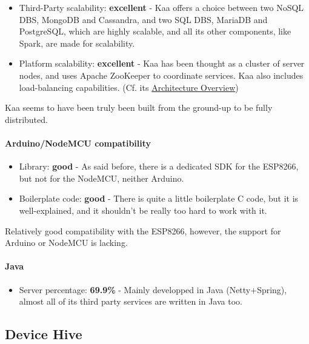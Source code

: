 \documentclass{article}
\begin{document}
\begin{itemize}
\item Third-Party scalability: \textbf{excellent} - Kaa offers a choice between two NoSQL DBS, MongoDB and Cassandra, and two SQL DBS, MariaDB and PostgreSQL, which are highly scalable, and all its other components, like Spark, are made for scalability.
\item Platform scalability: \textbf{excellent} - Kaa has been thought as a cluster of server nodes, and uses Apache ZooKeeper to coordinate services. Kaa also includes load-balancing capabilities. (Cf. its \href{https://kaaproject.github.io/kaa/docs/v0.10.0/Architecture-overview/}{Architecture Overview})
\end{itemize}

Kaa seems to have been truly been built from the ground-up to be fully distributed.

\paragraph{Arduino/NodeMCU compatibility}

\begin{itemize}
\item Library: \textbf{good} - As said before, there is a dedicated SDK for the ESP8266, but not for the NodeMCU, neither Arduino.
\item Boilerplate code: \textbf{good} - There is quite a little boilerplate C code, but it is well-explained, and it shouldn't be really too hard to work with it.
\end{itemize}

Relatively good compatibility with the ESP8266, however, the support for Arduino or NodeMCU is lacking.

\paragraph{Java}

\begin{itemize}
\item Server percentage: \textbf{69.9\%} - Mainly developped in Java (Netty+Spring), almost all of its third party services are written in Java too.
\end{itemize}

\subsection{Device Hive}
\end{document}
